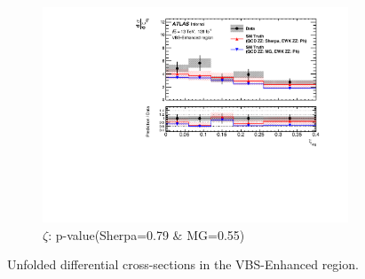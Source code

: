 \begin{figure}[!htb]
\begin{subfigure}{.49\textwidth}
        \includegraphics[width=.98\linewidth]{figures/Results/CrossSection_VBSEnhanced/xs_centrality_SR.pdf}
        \caption{ \footnotesize{$\zeta$: p-value(Sherpa=0.79 $\&$ MG=0.55)} }
    \end{subfigure}
    \caption{Unfolded differential cross-sections in the VBS-Enhanced region.}  \label{fig:unfolded_xs_VBS_Enhanced_b}
\end{figure}
